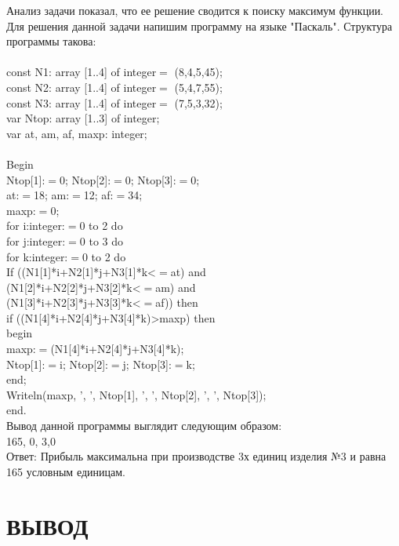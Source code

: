 \documentclass[russian,utf8,nocolumnxxxi,nocolumnxxxii]{eskdtext}
\begin{document}
Анализ задачи показал, что ее решение сводится к поиску максимум функции. Для решения данной задачи напишим программу на языке "Паскаль".
Структура программы такова:\\
\\
 const N1: array [1..4] of integer$=$ (8,4,5,45);\\
const N2: array [1..4] of integer$=$ (5,4,7,55);\\
const N3: array [1..4] of integer$=$ (7,5,3,32);\\
var Ntop: array [1..3] of integer;\\
var at, am, af, maxp: integer; \\
\\
Begin\\
    Ntop[1]:$=$0; Ntop[2]:$=$0; Ntop[3]:$=$0;\\
    at:$=$18; am:$=$12; af:$=$34;\\
    maxp:$=$0;\\
    for i:integer:$=$0 to 2 do\\
       for j:integer:$=$0 to 3 do\\ 
           for k:integer:$=$0 to 2 do\\
             If ((N1[1]*i+N2[1]*j+N3[1]*k<$=$at) and\\ (N1[2]*i+N2[2]*j+N3[2]*k<$=$am) and\\ (N1[3]*i+N2[3]*j+N3[3]*k<$=$af)) then\\
                 if ((N1[4]*i+N2[4]*j+N3[4]*k)>maxp) then\\ 
                       begin\\
                         maxp:$=$(N1[4]*i+N2[4]*j+N3[4]*k);\\
                         Ntop[1]:$=$i; Ntop[2]:$=$j; Ntop[3]:$=$k;\\
                       end;\\
    Writeln(maxp, ', ', Ntop[1], ', ', Ntop[2], ', ', Ntop[3]);\\
end.\\

Вывод данной программы выглядит следующим образом:\\ 165, 0, 3,0\\

Ответ: Прибыль максимальна при производстве 3х единиц изделия №3 и равна 165 условным единицам.

\newpage
\section{ВЫВОД}
\end{document}
